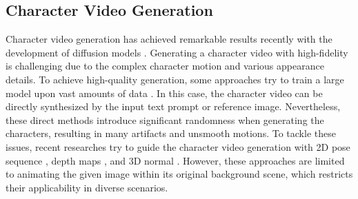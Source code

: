 






\subsection{Character Video Generation}

Character video generation has achieved remarkable results recently with the development of diffusion models \cite{ho2020denoising,song2020denoising,lu2022dpm}.
Generating a character video with high-fidelity is challenging due to the complex character motion and various appearance details.
To achieve high-quality generation, some approaches try to train a large model upon vast amounts of data \cite{liu2024sora,yang2024cogvideox,li2024openhumanvid,guo2023animatediff,blattmann2023stable,bao2024vidu}.
In this case, the character video can be directly synthesized by the input text prompt or reference image.
Nevertheless, these direct methods introduce significant randomness when generating the characters, resulting in many artifacts and unsmooth motions.
To tackle these issues, recent researches try to guide the character video generation with 2D pose sequence \cite{hu2024animate,xu2024magicanimate,peng2024controlnext,chang2023magicdance,chang2024magicpose,wang2024holistic,zhai2024idol,wang2024disco}, depth maps \cite{zhu2025champ}, and 3D normal \cite{zhu2025champ}.
However, these approaches are limited to animating the given image within its original background scene, which restricts their applicability in diverse scenarios.




